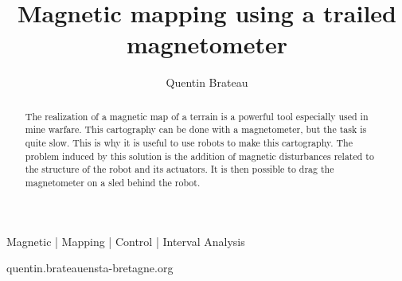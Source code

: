 \documentclass[times, twoside, watermark]{style}
\begin{document}
\title{Magnetic mapping using a trailed magnetometer}

\author[1,\Letter]{Quentin Brateau}


\maketitle

\begin{abstract}
    The realization of a magnetic map of a terrain is a powerful tool especially used in mine warfare. This cartography can be done with a magnetometer, but the task is quite slow. This is why it is useful to use robots to make this cartography. The problem induced by this solution is the addition of magnetic disturbances related to the structure of the robot and its actuators. It is then possible to drag the magnetometer on a sled behind the robot. 
\end {abstract}

\begin{keywords}
Magnetic | Mapping | Control | Interval Analysis
\end{keywords}

\begin{corrauthor}
quentin.brateau\at ensta-bretagne.org
\end{corrauthor}
















% 
\end{document}
